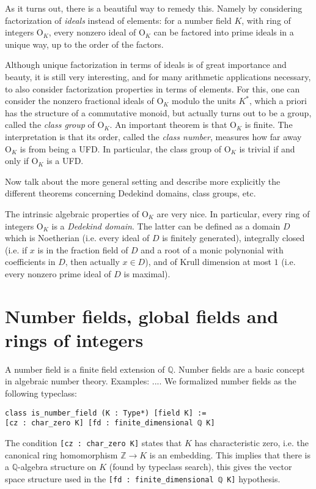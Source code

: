 \documentclass[a4paper,USenglish,cleveref, autoref, thm-restate]{lipics-v2021}
\newcommand{\lean}[1]{\texttt{#1}\xspace} %
\newcommand{\OK}{\mathrm{O}_K}
\newcommand{\Q}{\mathbb{Q}}
\newcommand{\Z}{\mathbb{Z}}
\begin{document}
As it turns out, there is a beautiful way to remedy this. Namely by considering factorization of \emph{ideals} instead of elements: for a number field $K$, with ring of integers $\OK$, every nonzero ideal of $\OK$ can be factored into prime ideals in a unique way, up to the order of the factors.

Although unique factorization in terms of ideals is of great importance and beauty, it is still very interesting, and for many arithmetic applications necessary, to also consider factorization properties in terms of elements. For this, one can consider the nonzero fractional ideals of $\OK$ modulo the units $K^*$, which a priori has the structure of a commutative monoid, but actually turns out to be a group, called the \emph{class group} of $\OK$. An important theorem is that $\OK$ is finite. The interpretation is that its order, called the \emph{class number}, measures how far away $\OK$ is from being a UFD. In particular, the class group of $\OK$ is trivial if and only if $\OK$ is a UFD.


Now talk about the more general setting and describe more explicitly  the different theorems concerning Dedekind domains, class groups, etc.

The intrinsic algebraic properties of $\OK$ are very nice. In particular, every ring of integers $\OK$ is a \emph{Dedekind domain}. The latter can be defined as a domain $D$ which is Noetherian (i.e. every ideal of $D$ is finitely generated), integrally closed (i.e. if $x$ is in the fraction field of $D$ and a root of a monic polynonial with coefficients in  $D$, then actually $x \in D$), and of Krull dimension at most $1$ (i.e. every nonzero prime ideal of $D$ is maximal).




\section{Number fields, global fields and rings of integers}

A number field is a finite field extension of $\Q$.
Number fields are a basic concept in algebraic number theory. Examples: ....
We formalized number fields as the following typeclass:
\begin{lstlisting}
class is_number_field (K : Type*) [field K] :=
[cz : char_zero K] [fd : finite_dimensional ℚ K]
\end{lstlisting}
The condition \lean{[cz : char\_zero K]} states that $K$ has characteristic zero, i.e. the canonical ring homomorphism $\Z \to K$ is an embedding.
This implies that there is a $\Q$-algebra structure on $K$ (found by typeclass search), this gives the vector space structure used in the \lean{[fd : finite\_dimensional ℚ K]} hypothesis.
\end{document}
